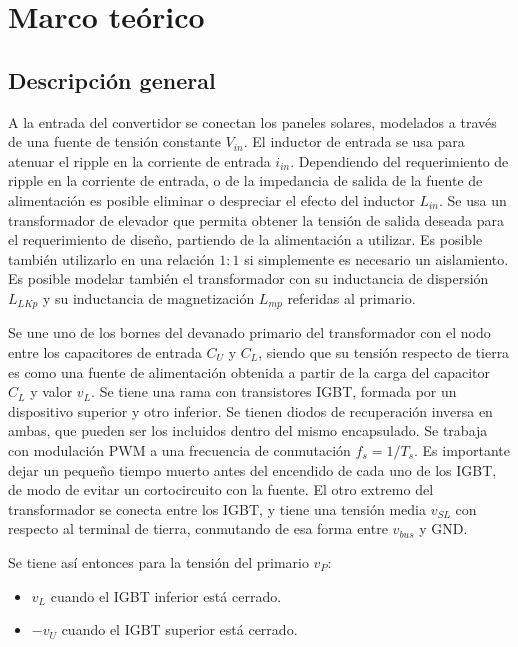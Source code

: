 \section{Marco teórico}

\subsection{Descripción general}

A la entrada del convertidor se conectan los paneles solares, modelados a través de una fuente de tensión constante $V_{in}$. El inductor de entrada se usa para atenuar el ripple en la corriente de entrada $i_{in}$. Dependiendo del requerimiento de ripple en la corriente de entrada, o de la impedancia de salida de la fuente de alimentación es posible eliminar o despreciar el efecto del inductor $L_{in}$. Se usa un transformador de elevador que permita obtener la tensión de salida deseada para el requerimiento de diseño, partiendo de la alimentación a utilizar. Es posible también utilizarlo en una relación $1:1$ si simplemente es necesario un aislamiento. Es posible modelar también el transformador con su inductancia de dispersión $L_{LKp}$ y su inductancia de magnetización $L_{mp}$ referidas al primario.

Se une uno de los bornes del devanado primario del transformador con el nodo entre los capacitores de entrada $C_U$ y $C_L$, siendo que su tensión respecto de tierra es como una fuente de alimentación obtenida a partir de la carga del capacitor $C_L$ y valor $v_L$.  Se tiene una rama con transistores IGBT, formada por un dispositivo superior y otro inferior. Se tienen diodos de recuperación inversa en ambas, que pueden ser los incluidos dentro del mismo encapsulado. Se trabaja con modulación PWM a una frecuencia de conmutación $f_s=1/T_s$. Es importante dejar un pequeño tiempo muerto antes del encendido de cada uno de los IGBT, de modo de evitar un cortocircuito con la fuente. El otro extremo del transformador se conecta entre los IGBT, y tiene una tensión media $v_{SL}$ con respecto al terminal de tierra, conmutando de esa forma entre $v_{bus}$ y GND.

Se tiene así entonces para la tensión del primario $v_P$:

\begin{itemize}
	\item $v_L$ cuando el IGBT inferior está cerrado.
	\item $-v_U$ cuando el IGBT superior está cerrado.
\end{itemize}

